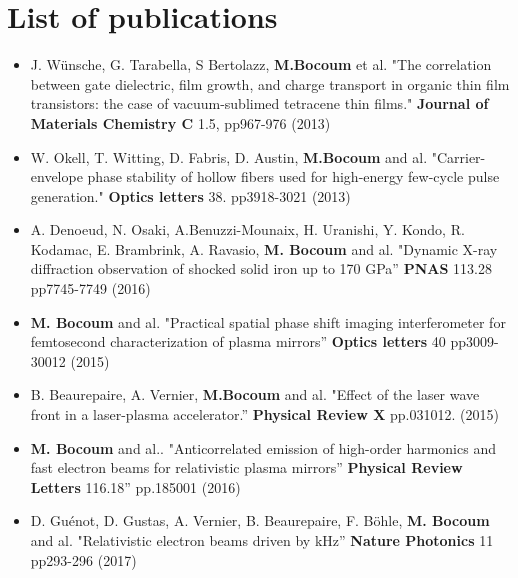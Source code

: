 \documentclass[11pt,a4paper,sans]{moderncv} %
\begin{document}


\section{List of publications}

\renewcommand{\listitemsymbol}{-~} %

\begin{itemize}
\item J. Wünsche, G. Tarabella, S Bertolazz, \textbf{M.Bocoum} et al. "The correlation between gate dielectric, film growth, and charge transport in organic thin film transistors: the case of vacuum-sublimed tetracene thin films."  \textbf{Journal of Materials Chemistry C}  1.5, pp967-976  (2013) 

\item W. Okell, T. Witting, D. Fabris, D. Austin, \textbf{M.Bocoum} and al. "Carrier-envelope phase stability of hollow fibers used for high-energy few-cycle pulse generation." \textbf{Optics letters} 38. pp3918-3021 (2013)

\item A. Denoeud, N. Osaki, A.Benuzzi-Mounaix, H. Uranishi, Y. Kondo, R. Kodamac, E. Brambrink, A. Ravasio, \textbf{M. Bocoum} and al. "Dynamic X-ray diffraction observation of shocked solid iron up to 170 GPa” \textbf{PNAS} 113.28 pp7745-7749 (2016)

\item \textbf{M. Bocoum} and al. "Practical spatial phase shift imaging interferometer for femtosecond characterization of plasma mirrors” \textbf{Optics letters} 40 pp3009-30012 (2015)

\item B. Beaurepaire, A. Vernier, \textbf{M.Bocoum} and al. "Effect of the laser wave front in a laser-plasma accelerator.” \textbf{Physical Review X} pp.031012. (2015)

\item \textbf{M. Bocoum}  and al.. "Anticorrelated emission of high-order harmonics and fast electron beams for relativistic plasma mirrors”  \textbf{Physical Review Letters} 116.18” pp.185001  (2016)

\item  D. Guénot, D. Gustas, A. Vernier, B. Beaurepaire, F. Böhle, \textbf{M. Bocoum} and al. "Relativistic electron beams driven by kHz” \textbf{Nature Photonics} 11 pp293-296 (2017)


\end{itemize}
\end{document}
